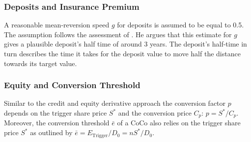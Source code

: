 \subsubsection*{Deposits and Insurance Premium}
A reasonable mean-reversion speed $g$ for deposits is assumed to be equal to 0.5. The assumption follows the assessment of \citet{pennacchi2010structural}. He argues that this estimate for $g$ gives a plausible deposit's half time of around 3 years. The deposit's half-time in turn describes the time it takes for the deposit value to move half the distance towards its target value.

\subsubsection*{Equity and Conversion Threshold}
Similar to the credit and equity derivative approach the conversion factor $p$ depends on the trigger share price $S^*$ and the conversion price $C_p$: $p = S^*/C_p$. Moreover, the conversion threshold $\bar{e}$ of a CoCo also relies on the trigger share price $S^*$ as outlined by $\bar{e} = E_\text{Trigger}/D_0 = n S^*/D_0$.

